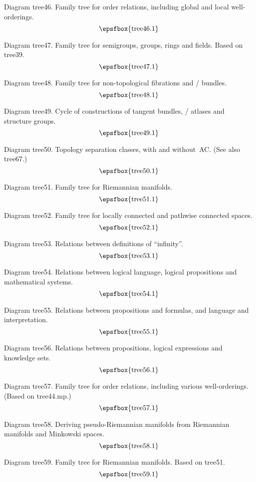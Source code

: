 Diagram tree46. Family tree for order relations, including global and local
well-orderings.
$$
\centerline{\epsfbox{tree46.1}}
$$

Diagram tree47. Family tree for semigroups, groups, rings and fields. Based on
tree39.
$$
\centerline{\epsfbox{tree47.1}}
$$

Diagram tree48. Family tree for non-topological fibrations and \fibre/ bundles.
$$
\centerline{\epsfbox{tree48.1}}
$$

Diagram tree49. Cycle of constructions of tangent bundles, \fibre/ atlases and
structure groups.
$$
\centerline{\epsfbox{tree49.1}}
$$

\filleject

Diagram tree50. Topology separation classes, with and without~AC. (See also
tree67.)
$$
\centerline{\epsfbox{tree50.1}}
$$

Diagram tree51. Family tree for Riemannian manifolds.
$$
\centerline{\epsfbox{tree51.1}}
$$

Diagram tree52. Family tree for locally connected and pathwise connected spaces.
$$
\centerline{\epsfbox{tree52.1}}
$$

Diagram tree53. Relations between definitions of ``infinity''.
$$
\centerline{\epsfbox{tree53.1}}
$$

\filleject

Diagram tree54. Relations between logical language, logical propositions and
mathematical systems.
$$
\centerline{\epsfbox{tree54.1}}
$$

Diagram tree55. Relations between propositions and formulas, and language and
interpretation.
$$
\centerline{\epsfbox{tree55.1}}
$$

Diagram tree56. Relations between propositions, logical expressions and
knowledge sets.
$$
\centerline{\epsfbox{tree56.1}}
$$

Diagram tree57. Family tree for order relations, including various
well-orderings. (Based on tree44.mp.)
$$
\centerline{\epsfbox{tree57.1}}
$$

\filleject

Diagram tree58. Deriving pseudo-Riemannian manifolds from Riemannian manifolds
and Minkowski spaces.
$$
\centerline{\epsfbox{tree58.1}}
$$

Diagram tree59. Family tree for Riemannian manifolds. Based on tree51.
$$
\centerline{\epsfbox{tree59.1}}
$$

